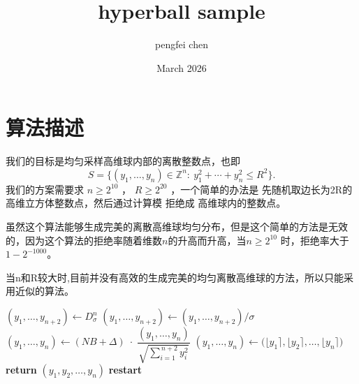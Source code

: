 \documentclass{article}
\title{hyperball sample}
\author{pengfei chen}
\date{March 2026}
\begin{document}
\maketitle

\section{算法描述}

    我们的目标是均匀采样高维球内部的离散整数点，也即
    \[
    S=\{(y_1,\dots,y_n)\in\mathbb{Z}^n:\ y_1^2+\cdots+y_n^2 \le R^2\}.
    \]
    我们的方案需要求 $n \geq {2}^{10} $ ，  $R \geq {2}^{20} $ ，一个简单的办法是
先随机取边长为2R的高维立方体整数点，然后通过计算模 拒绝成 高维球内的整数点。

    虽然这个算法能够生成完美的离散高维球均匀分布，但是这个简单的方法是无效的，因为这个算法的拒绝率随着维数$n$的升高而升高，当$n \geq {2}^{10} $ 时，拒绝率大于$1-2^{-1000}$。
    
    当n和R较大时,目前并没有高效的生成完美的均匀离散高维球的方法，所以只能采用近似的算法。
    

 
\begin{algorithm}
  \caption{}
  \begin{algorithmic}[1]
      \State $(y_1,\ldots,y_{n+2}) \leftarrow D_\sigma ^n $
      \State $(y_1,\ldots,y_{n+2}) \leftarrow (y_1,\ldots,y_{n+2})/\sigma$
      \State $(y_1,\ldots,y_n) \leftarrow (NB + \Delta)\;\cdot\;
             \dfrac{(y_1,\ldots,y_n)}{\sqrt{\sum_{i=1}^{\,n+2} y_i^2}}$
      \State $(y_1,\ldots,y_n) \leftarrow
             \big(\lfloor y_1\rceil , \lfloor  y_2 \rceil ,\ldots,\lfloor  y_n\rceil\big)$
        \State \textbf{return} $(y_1,y_2,\ldots,y_n)$
      \Else
        \State \textbf{restart} 
      \EndIf
  \end{algorithmic}
\end{algorithm}
\end{document}
